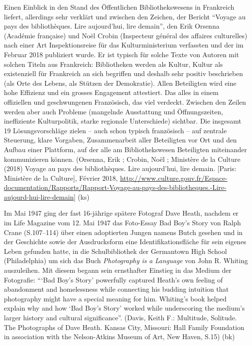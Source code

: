 \documentclass[a4paper,
fontsize=11pt,
oneside,
numbers=noperiodatend,
parskip=half-,
bibliography=totoc,
final
]{scrartcl}
\begin{document}
Einen Einblick in den Stand des Öffentlichen Bibliothekswesens in
Frankreich liefert, allerdings sehr verklärt und zwischen den Zeichen,
der Bericht \enquote{Voyage au pays des bibliothèques. Lire aujourd'hui,
lire demain}, den Erik Orsenna (Académie française) und Noël Crobin
(Inspecteur général des affaires culturelles) nach einer Art
Inspektionsreise für das Kulturministerium verfassten und der im Februar
2018 publiziert wurde. Er ist typisch für solche Texte von Autoren mit
solchen Titeln aus Frankreich: Bibliotheken werden als Kultur, Kultur
als existenziell für Frankreich an sich begriffen und deshalb sehr
positiv beschrieben (als Orte des Lebens, als Stützen der Demokratie).
Allen Beteiligten wird eine hohe Effizienz und ein grosses Engagement
attestiert. Das alles in einem offiziellen und geschwungenen
Französisch, das viel verdeckt. Zwischen den Zeilen werden aber auch
Probleme (mangelnde Ausstattung und Öffnungszeiten, ineffiziente
Kulturpolitik, starke regionale Unterschiede) sichtbar. Die insgesamt 19
Lösungsvorschläge zielen -- auch schon typisch französisch -- auf
zentrale Steuerung, klare Vorgaben, Zusammenarbeit aller Beteiligten vor
Ort und den Aufbau einer Plattform, auf der alle am Bibliothekswesen
Beteiligten miteinander kommunizieren können. (Orsenna, Erik ; Crobin,
Noël ; Ministère de la Culture (2018) Voyage au pays des bibliothèques.
Lire aujourd'hui, lire demain. {[}Paris: Ministère de la Culture{]},
Février 2018,
\url{http://www.culture.gouv.fr/Espace-documentation/Rapports/Rapport-Voyage-au-pays-des-bibliotheques.-Lire-aujourd-hui-lire-demain}{]}
(ks)

Im Mai 1947 ging der fast 16-jährige spätere Fotograf Dave Heath,
nachdem er im Life Magazine vom 12. Mai 1947 das Foto-Essay Bad Boy's
Story von Ralph Crane (S.107--114) über einen adoptierten Jungen namens
Butch gesehen und in der Geschichte sowie der Ausdrucksform eine
Identifikationsfläche für sein eigenes Leben gefunden hatte, in die
Schulbibliothek der Germantown High School (Philadelphia) um sich das
Buch \emph{Photography is a Language} von John R. Whiting
auszuleihen\emph{.} Mit diesem begann sein ernsthafter Einstieg in das
Medium der Fotografie: \enquote{\enquote{Bad Boy's Story} powerfully
captured Heath's own feeling of abandonment and homelessness while
connecting his budding intuition that photography might have a special
meaning for him. Whiting's book helped explain why and how \enquote{Bad
Boy's Story} worked while underscoring the medium's larger history and
cultural significance}. (Davis, Keith F.: Multitude, Solitude. The
Photographs of Dave Heath. Kansas City, Missouri: Hall Family Foundation
in association with the Nelson-Atkins Museum of Art, New Haven, S.15)
(bk)

\end{document}
